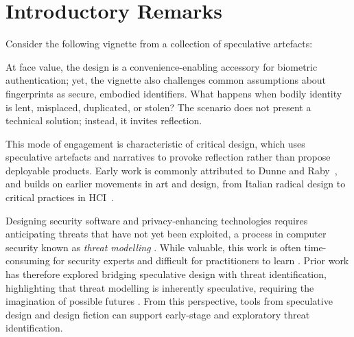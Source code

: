 

\section{Introductory Remarks}



Consider the following vignette from a collection of speculative artefacts:


At face value, the design is a convenience-enabling accessory for biometric authentication; yet, the vignette also challenges common assumptions about fingerprints as secure, embodied identifiers. What happens when bodily identity is lent, misplaced, duplicated, or stolen? The scenario does not present a technical solution; instead, it invites reflection. 

This mode of engagement is characteristic of critical design, which uses speculative artefacts and narratives to provoke reflection rather than propose deployable products. Early work is commonly attributed to Dunne and Raby~\cite{DuRa01,Dun05}, and builds on earlier movements in art and design, from Italian radical design to critical practices in HCI~\cite{Mal17}. 

Designing security software and privacy-enhancing technologies requires anticipating threats that have not yet been exploited, a process in computer security known as \textit{threat modelling} \cite{shostack2014threat}. While valuable, this work is often time-consuming for security experts and difficult for practitioners to learn \cite{shostack_fast_cheap_good}. Prior work has therefore explored bridging speculative design with threat identification, highlighting that threat modelling is inherently speculative, requiring the imagination of possible futures \cite{merrill2020security}. From this perspective, tools from speculative design and design fiction can support early-stage and exploratory threat identification.


